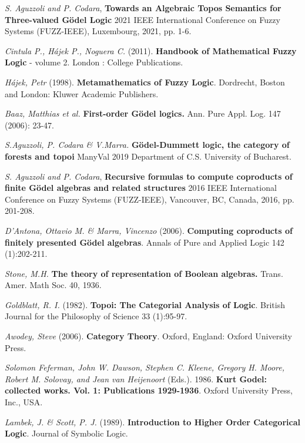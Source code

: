 \begin{thebibliography}{30}
	\emph{S. Aguzzoli and P. Codara}, \textbf{Towards an Algebraic Topos Semantics for Three-valued Gödel Logic} 2021 IEEE International Conference on Fuzzy Systems (FUZZ-IEEE), Luxembourg, 2021, pp. 1-6.
	
	\emph{Cintula P., Hájek P., Noguera C.} (2011).\textbf{ Handbook of Mathematical Fuzzy Logic} - volume 2. London : College Publications.
	
	\emph{Hájek, Petr} (1998). \textbf{Metamathematics of Fuzzy Logic}. Dordrecht, Boston and London: Kluwer Academic Publishers.
	
	\emph{Baaz, Matthias et al.} \textbf{First-order Gödel logics.} Ann. Pure Appl. Log. 147 (2006): 23-47.
	
	\emph{S.Aguzzoli, P. Codara \& V.Marra.} \textbf{Gödel-Dummett logic, the category of forests and topoi} 
	ManyVal 2019 Department of C.S. University of Bucharest.
	
	\emph{S. Aguzzoli and P. Codara}, \textbf{Recursive formulas to compute coproducts of finite Gödel algebras and related structures} 2016 IEEE International Conference on Fuzzy Systems (FUZZ-IEEE), Vancouver, BC, Canada, 2016, pp. 201-208.
	
	\emph{D’Antona, Ottavio M. \& Marra, Vincenzo} (2006). \textbf{Computing coproducts of finitely presented Gödel algebras}. Annals of Pure and Applied Logic 142 (1):202-211.
	
	\emph{Stone, M.H.} \textbf{The theory of representation of Boolean algebras.} Trans. Amer. Math Soc. 40, 1936.
	
	\emph{Goldblatt, R. I.} (1982). \textbf{Topoi: The Categorial Analysis of Logic}. British Journal for the Philosophy of Science 33 (1):95-97.
	
	\emph{Awodey, Steve} (2006). \textbf{Category Theory}. Oxford, England: Oxford University Press.
	
	\emph{Solomon Feferman, John W. Dawson, Stephen C. Kleene, Gregory H. Moore, Robert M. Solovay, and Jean van Heijenoort} (Eds.). 1986. \textbf{Kurt Godel: collected works. Vol. 1: Publications 1929-1936}. Oxford University Press, Inc., USA.
	
	
	\emph{Lambek, J. \& Scott, P. J.} (1989). \textbf{Introduction to Higher Order Categorical Logic}. Journal of Symbolic Logic.
	

\end{thebibliography}
